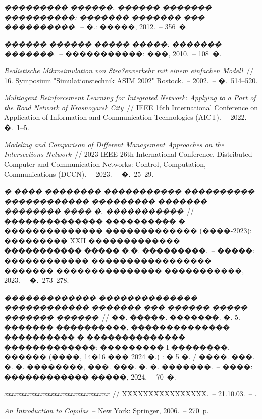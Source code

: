 \documentclass[11pt]{ubs}
\begin{document}
\begin{thebibliography}{10}
 \textit{��������� ������. ������ ������� ����������: ������� ������� ��� ����������.}~-- �.: �����, 2012.~-- 356~�.

 \textit{������ ������ �����-�����: ������� �������.}~-- �����������: ���, 2010.~-- 108~�.

 \textit{Realistische Mikrosimulation von Stra?enverkehr mit einem einfachen Modell}~// 16. Symposium "Simulationstechnik ASIM 2002" Rostock.~-- 2002.~-- �.~514--520.

 \textit{Multiagent Reinforcement Learning for Integrated Network: Applying to a Part of the Road Network of Krasnoyarsk City}~// IEEE 16th International Conference on Application of Information and Communication Technologies (AICT).~-- 2022.~-- �.~1--5.

 \textit{Modeling and Comparison of Different Management Approaches on the Intersections Network}~// 2023 IEEE 26th International Conference, Distributed Computer and Communication Networks: Control, Computation, Communications (DCCN).~-- 2023.~-- �.~25--29.

 \textit{� ���� �������� ����������� ���������� ������������ ��������� ������� �������� ���� �. �����������}~// �������������� ���������� � �������������� ������������� (����-2023): ��������� XXII ������������� ����������� ����� �.�. ���������.~-- �����: ������������ ����������������� ������� ��������������� �����������, 2023.~-- �.~273--278.

 \textit{������������� �������������� ������������ ������� ��� ������ ����� �������-������}~// ��. �����. �������. �. 5. ������� ����������, �������������� ���������� � �������������� �������������: ��������� I ��������. ������ (����, 14�16 ��� 2024 �.) : � 5 �. / ����. ���. �. �. ��������, ���. ���. �. �. �������.~-- ����: ������������ �����, 2024.~-- 70~�.

 \textit{xxxxxxxxxxxxxxxxxxxxxxxxxxxxxxxx}~// XXXXXXXXXXXXXXXX.~-- 21.10.03.~-- .

 \textit{An Introduction to Copulas}~-- New York: Springer, 2006.~-- 270~p.


\end{thebibliography}
\end{document}
